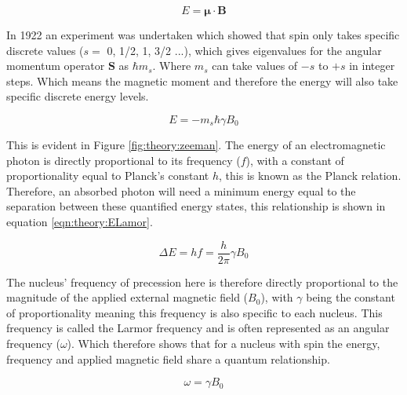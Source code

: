 \begin{equation}
    E = \mathbf{\mu} \cdot \mathbf{B}
\end{equation}

In 1922 an experiment was undertaken \cite{Gerlach1922DerMagnetfeld} which showed that spin only takes specific discrete values ($s =$ 0, 1/2, 1, 3/2 ...), which gives eigenvalues for the angular momentum operator $\mathbf{S}$ as $\hbar m_s$. Where $m_s$ can take values of $-s$ to $+s$ in integer steps. Which means the magnetic moment and therefore the energy will also take specific discrete energy levels.

\begin{equation}
    E = -m_s\hbar \gamma B_0
    \label{eqn:theory:ESpin}
\end{equation}

This is evident in Figure \ref{fig:theory:zeeman}. The energy of an electromagnetic photon is directly 
proportional to its frequency ($f$), with a constant of proportionality equal to Planck's constant $h$, this is known as the Planck relation. Therefore, an absorbed photon will need a minimum energy equal to the separation between these quantified energy states, this relationship is shown in equation \ref{eqn:theory:ELamor}.

\begin{equation}
    \Delta E = hf = \frac{h}{2\pi}\gamma B_0
    \label{eqn:theory:ELamor}
\end{equation}  

The nucleus' frequency of precession here is therefore directly proportional to the magnitude of the applied external magnetic field ($B_0$), with $\gamma$ being the constant of proportionality meaning this frequency is also specific to each nucleus. This frequency is called the Larmor frequency \cite{Larmor1897LXIII.Ions} and is often represented as an angular frequency ($\omega$). Which therefore shows that for a nucleus with spin the energy, frequency and applied magnetic field share a quantum relationship. 

\begin{equation}
    \omega = \gamma B_0
    \label{eqn:theory:Lamor}
\end{equation}

